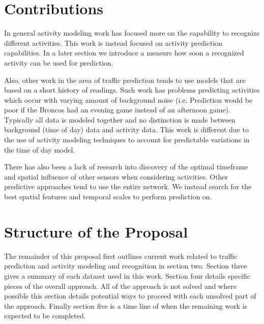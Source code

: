 \section{Contributions}  
In general activity modeling work has focused more on the capability to recognize different activities.  This work is instead focused on activity prediction capabilities.  In a later section we introduce a measure how soon a recognized activity can be used for prediction.

Also, other work in the area of traffic prediction tends to use models that are based on a short history of readings.  Such work has problems predicting activities which occur with varying amount of background noise (i.e. Prediction would be poor if the Broncos had an evening game instead of an afternoon game).  Typically all data is modeled together and no distinction is made between background (time of day) data and activity data.  This work is different due to the use of activity modeling techniques to account for predictable variations in the time of day model.  

There has also been a lack of research into discovery of the optimal timeframe and spatial influence of other sensors when considering activities.  Other predictive approaches tend to use the entire network.  We instead search for the best spatial features and temporal scales to perform prediction on.


\section{Structure of the Proposal}
The remainder of this proposal first outlines current work related to traffic prediction and activity modeling and recognition in section two.  Section three gives a summary of each dataset used in this work.  Section four details specific pieces of the overall approach.  All of the approach is not solved and where possible this section details potential ways to proceed with each unsolved part of the approach.  Finally section five is a time line of when the remaining work is expected to be completed.

